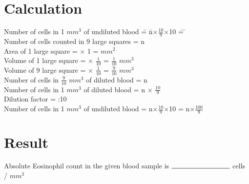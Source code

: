 \documentclass[a4paper,12pt,openany,twoside]{book}
\begin{document}
					\section*{Calculation}
					\begin{tabbing}
Number of cells in 1 $mm^3$ of undiluted blood \= = \= n$\times$$\frac{10}{9}$$\times$10 \= = \= \kill\\

					Number of cells counted in 9 large squares		\>		= \>	n\\
					Area of 1 large square \>	= \>	1 $\times$ 1 \>		=	$mm^2$\\	
					Volume of 1 large square \>				=	 $\times$ $\frac{1}{10}$ \>	= \>	$\frac{1}{10}$ $mm^3$\\
					Volume of 9 large square \>			=	 $\times$ $\frac{1}{10}$ \>	= \>	$\frac{9}{10}$ $mm^3$\\
					Number of cells in $\frac{9}{10}$ $mm^3$ of diluted blood			\>	= \>	n\\
					Number of cells in 1 $mm^3$ of diluted blood \>				=	\> n $\times$ $\frac{10}{9}$\\
					Dilution factor			\>					=	:10\\
					Number of cells in 1 $mm^3$ of undiluted blood	\>	=	\> n$\times$$\frac{10}{9}$$\times$10 \> = \>	n$\times$$\frac{100}{9}$\\
					\end{tabbing}
					\section*{Result}

					Absolute Eosinophil count in the given  blood sample is $\rule{3cm}{0.5pt}$ cells / $mm^3$
\end{document}
